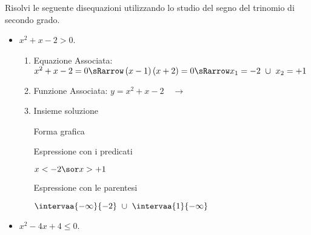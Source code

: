 \begin{esempio}
Risolvi le seguente disequazioni utilizzando lo studio del segno del trinomio
di secondo grado.

\begin{itemize}
\item \(x^2+x-2>0\).

\begin{enumerate}
 \item
  Equazione Associata:~\(x^2+x-2=0 \sRarrow
                        \left(x-1 \right)\left(x+2\right)=0 \sRarrow
                        x_1=-2~\cup~x_2=+1\)
 \item
  \begin{minipage}{.45\textwidth}
  Funzione Associata: \(y = x^2+x-2 \quad \rightarrow\)
  \end{minipage}
  \begin{minipage}{.30\textwidth}
  \end{minipage}
 \item
 Insieme soluzione\\

  \begin{minipage}{.32\textwidth}
  Forma grafica\\[-.7em]

 \begin{center}
  \vspace{.4em}
 \end{center}
  \end{minipage}
  \begin{minipage}{.32\textwidth}
  Espressione con i predicati\\[-.3em]

 \begin{center}
  \(x<-2 \sor x>+1\)
  \vspace{1em}
 \end{center}
  \end{minipage}
  \begin{minipage}{.32\textwidth}
  Espressione con le parentesi\\[-.3em]

 \begin{center}
  \(\intervaa{-\infty}{-2}~\cup~\intervaa{1}{-\infty}\)
  \vspace{.8em}
 \end{center}
  \end{minipage}
\end{enumerate}

\item \(x^2-4x+4\le0\).


\end{itemize}
\end{esempio}
